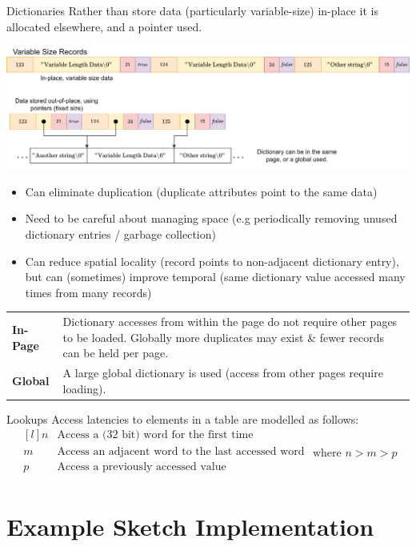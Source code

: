 \begin{definitionbox}{Dictionaries}
    Rather than store data (particularly variable-size) in-place it is allocated elsewhere, and a pointer used.
    \begin{center}
        \includegraphics[width=.8\textwidth]{storage/images/dictionary_layout.drawio.png}
    \end{center}
    \begin{itemize}
        \item Can eliminate duplication (duplicate attributes point to the same data)
        \item Need to be careful about managing space (e.g periodically removing unused dictionary entries / garbage collection)
        \item Can reduce spatial locality (record points to non-adjacent dictionary entry), but can (sometimes) improve temporal (same dictionary value accessed many times from many records) 
    \end{itemize}
    \begin{center}
        \begin{tabular}{l p{}}
            \textbf{In-Page} & Dictionary accesses from within the page do not require other pages to be loaded. Globally more duplicates may exist \& fewer records can be held per page. \\
            \textbf{Global} & A large global dictionary is used (access from other pages require loading). \\
        \end{tabular}
    \end{center}
\end{definitionbox}

\begin{examplebox}{Lookups}
    Access latencies to elements in a table are modelled as follows:
    \[\begin{matrix*}[l]
        n & \text{Access a (32 bit) word for the first time} \\
        m & \text{Access an adjacent word to the last accessed word} \\
        p & \text{Access a previously accessed value} \\
    \end{matrix*} \text{ where } n > m > p\]
    \unfinished
\end{examplebox}

\section{Example Sketch Implementation}
\unfinished


